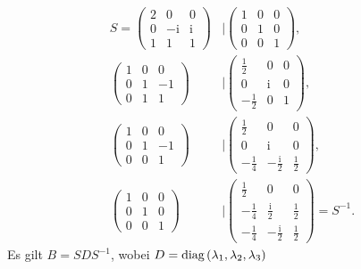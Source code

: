 \documentclass[english, parskip=full]{scrartcl}
\newcommand{\tecxt}{}
\renewcommand{\i}{\text{i}}
\begin{document}
\begin{align}
S= \begin{pmatrix}
2 & 0 & 0 \\ 0 & -\i & \i \\ 1 & 1 & 1
\end{pmatrix} &\Bigg\vert \begin{pmatrix}
1 & 0 & 0 \\ 0 & 1 & 0 \\ 0 & 0 & 1
\end{pmatrix},\\
\begin{pmatrix}
1 & 0 & 0 \\ 0 & 1 & -1 \\ 0 & 1 & 1
\end{pmatrix} &\Bigg\vert \begin{pmatrix}
\frac{1}{2} & 0 & 0 \\ 0 & \i & 0 \\ -\frac{1}{2} & 0 & 1
\end{pmatrix},\\
\begin{pmatrix}
1 & 0 & 0 \\ 0 & 1 & -1 \\ 0 & 0 & 1
\end{pmatrix} &\Bigg\vert \begin{pmatrix}
\frac{1}{2} & 0 & 0 \\ 0 & \i & 0 \\ -\frac{1}{4} & -\frac{\i}{2} & \frac{1}{2}
\end{pmatrix},\\
\begin{pmatrix}
1 & 0 & 0 \\ 0 & 1 & 0 \\ 0 & 0 & 1
\end{pmatrix} &\Bigg\vert \begin{pmatrix}
\frac{1}{2} & 0 & 0 \\ -\frac{1}{4} & \frac{\i}{2} & \frac{1}{2} \\ -\frac{1}{4} & -\frac{\i}{2} & \frac{1}{2}
\end{pmatrix} = S^{-1}.
\end{align}
Es gilt $B = S DS^{-1}$, wobei $D=\tecxt\text{diag\,}(\lambda_1,\lambda_2,\lambda_3)$
\end{document}
